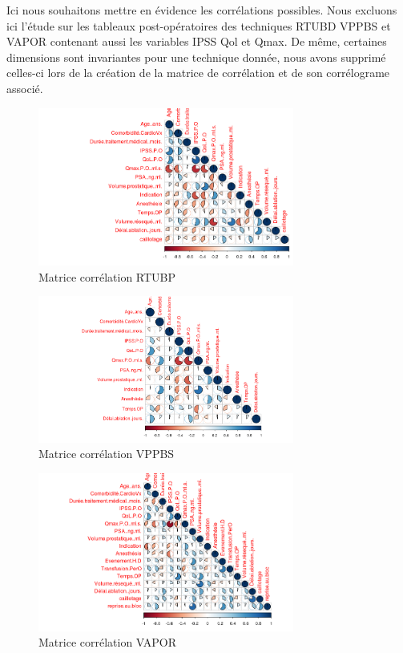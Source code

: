 %
%

Ici nous souhaitons mettre en évidence les corrélations possibles.
Nous excluons ici l’étude sur les tableaux post-opératoires des techniques RTUBD VPPBS et VAPOR contenant 
aussi les variables IPSS Qol et Qmax.
De même, certaines dimensions sont invariantes pour une technique donnée, nous avons supprimé celles-ci lors de la création 
de la matrice de corrélation et de son corrélograme associé.

\begin{figure}[H]
\centering
\includegraphics[width=0.75\textwidth]{../Fig/RTUPB/rtupb-corr-matrice-pie}
\caption{Matrice corrélation RTUBP}
\end{figure}

\begin{figure}[H]
\centering
\includegraphics[width=0.75\textwidth]{../Fig/VPPBS/vppbs-corr-matrice-pie}
\caption{Matrice corrélation VPPBS}
\end{figure}

\begin{figure}[H]
\centering
\includegraphics[width=0.75\textwidth]{../Fig/VAPOR/vapor-corr-matrice-pie}
\caption{Matrice corrélation VAPOR}
\end{figure}



